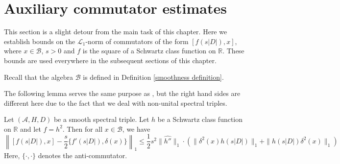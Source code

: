 \section{Auxiliary commutator estimates}\label{commutator section}
    This section is a slight detour from the main task of this chapter. Here we establish bounds on the $\mathcal{L}_1$-norm of commutators
    of the form $[f(s|D|),x]$, where $x \in \mathcal{B}$, $s > 0$ and $f$ is the square of a Schwartz class function on $\mathbb{R}.$ These bounds are used everywhere in the subsequent sections of this chapter.
    
    Recall that the algebra $\mathcal{B}$ is defined in Definition \ref{smoothness definition}.
    
    The following lemma serves the same purpose as \cite[Lemma 18]{CPRS1}, but the right hand sides are different here due to the fact that we deal with non-unital spectral triples.
    \begin{lem}\label{first commutator lemma} 
        Let $(\mathcal{A}, H, D)$ be a smooth spectral triple. Let $h$ be a Schwartz class function on $\mathbb{R}$ and let $f = h^2$. Then for all $x \in \mathcal{B}$, we have
        \begin{equation*}
            \left\|[f(s|D|),x]-\frac{s}{2}\{f'(s|D|),\delta(x)\}\right\|_1 \leq \frac{1}{2}s^2\|\widehat{h''}\|_1\cdot \left(\|\delta^2(x)h(s|D|)\|_1+\|h(s|D|)\delta^2(x)\|_1\right)
        \end{equation*}
        Here, $\{\cdot,\cdot\}$ denotes the anti-commutator.
    \end{lem}
